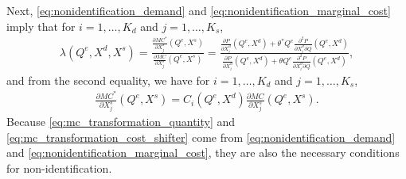 \documentclass[11pt, a4paper]{article}
\theoremstyle{remark}
\begin{document}
Next, \eqref{eq:nonidentification_demand} and \eqref{eq:nonidentification_marginal_cost} imply that for $i = 1, \ldots, K_d$ and $j = 1, \ldots, K_s$,
\begin{align}
    \lambda(Q^e, X^{d}, X^{s}) =  \frac{\frac{\partial MC^{*}}{\partial X^{s}_j}(Q^e, X^{s})}{\frac{\partial MC}{\partial X^{s}_j}(Q^e, X^{s})} =  \frac{\frac{\partial P}{\partial X^{d}_i}(Q^e, X^{d}) + \theta^{*} Q^e\frac{\partial^2 P}{\partial X^{d}_{i}\partial Q}(Q^e, X^{d}) }{\frac{\partial P}{\partial X^{d}_i}(Q^e, X^{d}) + \theta Q^e\frac{\partial^2 P}{\partial X^{d}_{i}\partial Q}(Q^e, X^{d})},
\end{align}
and from the second equality, we have for $i = 1, \ldots, K_d$ and $j = 1, \ldots, K_s$,
\begin{align}
    \frac{\partial MC^{*}}{\partial X^{s}_j}(Q^e, X^{s}) = C_i(Q^e, X^{d})\frac{\partial MC}{\partial X^{s}_j}(Q^e, X^{s}).\label{eq:mc_transformation_cost_shifter}
\end{align}
Because \eqref{eq:mc_transformation_quantity} and \eqref{eq:mc_transformation_cost_shifter} come from \eqref{eq:nonidentification_demand} and \eqref{eq:nonidentification_marginal_cost}, they are also the necessary conditions for non-identification.
\end{document}
